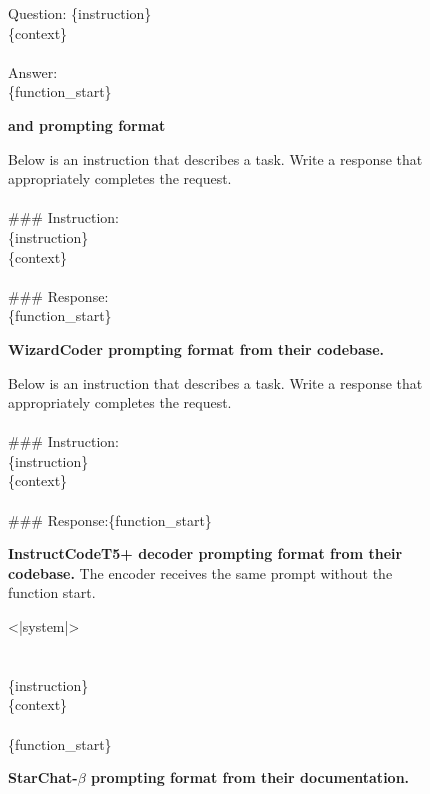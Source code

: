 \begin{figure}[htbp]
\hrulefill

Question: \{instruction\}\\\{context\}\\\\Answer:\\\{function\_start\}

\hrulefill
\caption[]{\textbf{\model{} and \modelx{} prompting format}}
\label{fig:octocoder}
\end{figure}


\begin{figure}[htbp]
\hrulefill

Below is an instruction that describes a task. Write a response that appropriately completes the request.\\\\\#\#\# Instruction:\\\{instruction\}\\\{context\}\\\\\#\#\# Response:\\\{function\_start\}

\hrulefill
\caption[]{\textbf{WizardCoder prompting format from their codebase.\footnotemark}}
\label{fig:wizardcoder}
\end{figure}


\begin{figure}[htbp]
\hrulefill

Below is an instruction that describes a task. Write a response that appropriately completes the request.\\\\\#\#\# Instruction:\\\{instruction\}\\\{context\}\\\\\#\#\# Response:\{function\_start\}

\hrulefill
\caption[]{\textbf{InstructCodeT5+ decoder prompting format from their codebase.\footnotemark} The encoder receives the same prompt without the function start.}
\label{fig:instructcodet5p}
\end{figure}


\begin{figure}[htbp]
\hrulefill

<|system|>\\<|end|>\\<|user|>\\\{instruction\}\\\{context\}<|end|>\\<|assistant|>\\\{function\_start\}

\hrulefill
\caption[]{\textbf{StarChat-$\beta$ prompting format from their documentation.\footnotemark}}
\label{fig:starchatbeta}
\end{figure}


